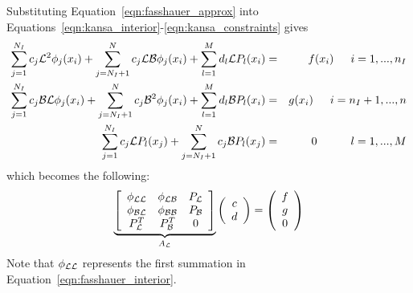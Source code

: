 \documentclass[11pt]{report}
\begin{document}
{Substituting Equation~\ref{eqn:fasshauer_approx} into Equations~\ref{eqn:kansa_interior}-\ref{eqn:kansa_constraints} gives
\begin{eqnarray}
\sum_{j=1}^{N_I}c_j\mathcal{L}^2{\phi_j(x_i)} + \sum_{j=N_I+1}^{N}c_j\mathcal{L}\mathcal{B}\phi_j(x_i) + \sum_{l=1}^{M}d_l \mathcal{L}P_l(x_i) &=&f(x_i)  \hskip1.5em i = 1,...,n_I  \label{eqn:fasshauer_interior} \\ 
\sum_{j=1}^{N_I}c_j\mathcal{B}\mathcal{L}\phi_j(x_i) + \sum_{j=N_I+1}^{N}c_j\mathcal{B}^2{\phi_j(x_i)} + \sum_{l=1}^{M}d_l \mathcal{B}P_l(x_i) &=& g(x_i)  \hskip1.5em i = n_I + 1,..., n \label{eqn:fasshauer_boundary} \nonumber \\
\sum_{j=1}^{N_I} c_j \mathcal{L}P_l(x_j) + \sum_{j=N_I + 1}^{N} c_j \mathcal{B}P_l(x_j) &=& 0 \hskip3.0em l=1,...,M \label{eqn:fasshauer_constraints} \nonumber 
\end{eqnarray}
which becomes the following: 
\begin{eqnarray}
\underbrace{\left[ \begin{array}{c c c} 
	\phi_{\mathcal{L}\mathcal{L}} & \phi_{\mathcal{L}\mathcal{B}} & P_{\mathcal{L}} \\
	\phi_{\mathcal{B}\mathcal{L}} & \phi_{\mathcal{B}\mathcal{B}} & P_{\mathcal{B}} \\
	P^T_{\mathcal{L}} & P^T_{\mathcal{B}} & 0 \\
	\end{array} \right]}_{A_{\mathcal{L}}} \left( \begin{array}{c}
							{c} \\
							{d}
							 \end{array}
						 \right) = \left( \begin{array}{c}
							{f} \\
							{g} \\
							0
							 \end{array}
						 \right) 
	\label{eqn:fasshauer_method}
\end{eqnarray}
Note that $\phi_{\mathcal{L}\mathcal{L}}$ represents the first summation in Equation~\ref{eqn:fasshauer_interior}. 

}
\end{document}
